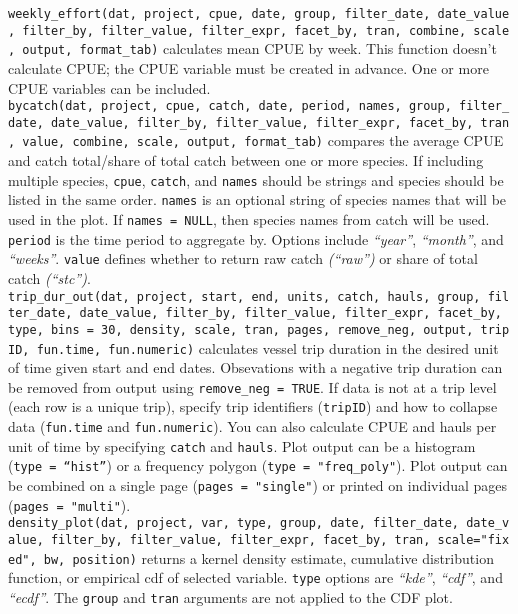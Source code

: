 \documentclass[
]{article}
\begin{document}
\texttt{weekly\_effort(dat,\ project,\ cpue,\ date,\ group,\ filter\_date,\ date\_value,\ filter\_by,\ filter\_value,\ filter\_expr,\ facet\_by,\ tran,\ combine,\ scale,\ output,\ format\_tab)} calculates mean CPUE by week. This function doesn't calculate CPUE; the CPUE variable must be created in advance. One or more CPUE variables can be included.\\
\texttt{bycatch(dat,\ project,\ cpue,\ catch,\ date,\ period,\ names,\ group,\ filter\_date,\ date\_value,\ filter\_by,\ filter\_value,\ filter\_expr,\ facet\_by,\ tran,\ value,\ combine,\ scale,\ output,\ format\_tab)} compares the average CPUE and catch total/share of total catch between one or more species. If including multiple species, \texttt{cpue}, \texttt{catch}, and \texttt{names} should be strings and species should be listed in the same order. \texttt{names} is an optional string of species names that will be used in the plot. If \texttt{names\ =\ NULL}, then species names from catch will be used. \texttt{period} is the time period to aggregate by. Options include \emph{``year''}, \emph{``month''}, and \emph{``weeks''}. \texttt{value} defines whether to return raw catch \emph{(``raw'')} or share of total catch \emph{(``stc'')}.\\
\texttt{trip\_dur\_out(dat,\ project,\ start,\ end,\ units,\ catch,\ hauls,\ group,\ filter\_date,\ date\_value,\ filter\_by,\ filter\_value,\ filter\_expr,\ facet\_by,\ type,\ bins\ =\ 30,\ density,\ scale,\ tran,\ pages,\ remove\_neg,\ output,\ tripID,\ fun.time,\ fun.numeric)} calculates vessel trip duration in the desired unit of time given start and end dates. Obsevations with a negative trip duration can be removed from output using \texttt{remove\_neg\ =\ TRUE}. If data is not at a trip level (each row is a unique trip), specify trip identifiers (\texttt{tripID}) and how to collapse data (\texttt{fun.time} and \texttt{fun.numeric}). You can also calculate CPUE and hauls per unit of time by specifying \texttt{catch} and \texttt{hauls}. Plot output can be a histogram (\texttt{type\ =\ “hist”}) or a frequency polygon (\texttt{type\ =\ "freq\_poly"}). Plot output can be combined on a single page (\texttt{pages\ =\ "single"}) or printed on individual pages (\texttt{pages\ =\ "multi"}).\\
\texttt{density\_plot(dat,\ project,\ var,\ type,\ group,\ date,\ filter\_date,\ date\_value,\ filter\_by,\ filter\_value,\ filter\_expr,\ facet\_by,\ tran,\ scale="fixed",\ bw,\ position)} returns a kernel density estimate, cumulative distribution function, or empirical cdf of selected variable. \texttt{type} options are \emph{``kde''}, \emph{``cdf''}, and \emph{``ecdf''}. The \texttt{group} and \texttt{tran} arguments are not applied to the CDF plot.
\end{document}
